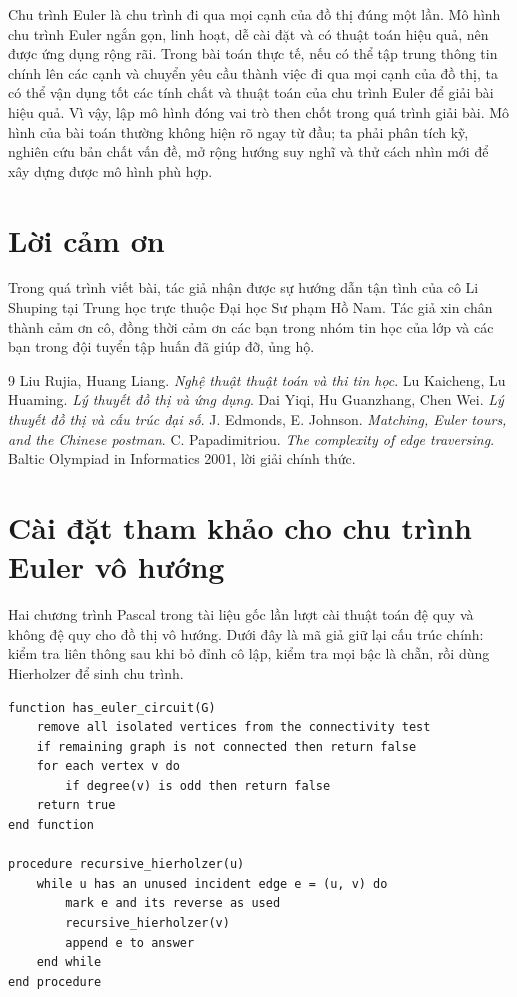 \documentclass[11pt]{article}
\begin{document}
Chu trình Euler là chu trình đi qua mọi cạnh của đồ thị đúng một lần. Mô hình
chu trình Euler ngắn gọn, linh hoạt, dễ cài đặt và có thuật toán hiệu quả, nên
được ứng dụng rộng rãi. Trong bài toán thực tế, nếu có thể tập trung thông tin
chính lên các cạnh và chuyển yêu cầu thành việc đi qua mọi cạnh của đồ thị,
ta có thể vận dụng tốt các tính chất và thuật toán của chu trình Euler để giải
bài hiệu quả. Vì vậy, lập mô hình đóng vai trò then chốt trong quá trình giải
bài. Mô hình của bài toán thường không hiện rõ ngay từ đầu; ta phải phân tích
kỹ, nghiên cứu bản chất vấn đề, mở rộng hướng suy nghĩ và thử cách nhìn mới
để xây dựng được mô hình phù hợp.

\section*{Lời cảm ơn}

Trong quá trình viết bài, tác giả nhận được sự hướng dẫn tận tình của cô Li
Shuping tại Trung học trực thuộc Đại học Sư phạm Hồ Nam. Tác giả xin chân
thành cảm ơn cô, đồng thời cảm ơn các bạn trong nhóm tin học của lớp và các
bạn trong đội tuyển tập huấn đã giúp đỡ, ủng hộ.

\begin{thebibliography}{9}
Liu Rujia, Huang Liang. \textit{Nghệ thuật thuật toán và thi tin học}.
Lu Kaicheng, Lu Huaming. \textit{Lý thuyết đồ thị và ứng dụng}.
Dai Yiqi, Hu Guanzhang, Chen Wei. \textit{Lý thuyết đồ thị và cấu trúc đại số}.
J. Edmonds, E. Johnson. \textit{Matching, Euler tours, and the Chinese postman}.
C. Papadimitriou. \textit{The complexity of edge traversing}.
Baltic Olympiad in Informatics 2001, lời giải chính thức.
\end{thebibliography}

\appendix

\section{Cài đặt tham khảo cho chu trình Euler vô hướng}

Hai chương trình Pascal trong tài liệu gốc lần lượt cài thuật toán đệ quy và
không đệ quy cho đồ thị vô hướng. Dưới đây là mã giả giữ lại cấu trúc chính:
kiểm tra liên thông sau khi bỏ đỉnh cô lập, kiểm tra mọi bậc là chẵn, rồi dùng
Hierholzer để sinh chu trình.

\begin{verbatim}
function has_euler_circuit(G)
    remove all isolated vertices from the connectivity test
    if remaining graph is not connected then return false
    for each vertex v do
        if degree(v) is odd then return false
    return true
end function

procedure recursive_hierholzer(u)
    while u has an unused incident edge e = (u, v) do
        mark e and its reverse as used
        recursive_hierholzer(v)
        append e to answer
    end while
end procedure
\end{verbatim}
\end{document}
